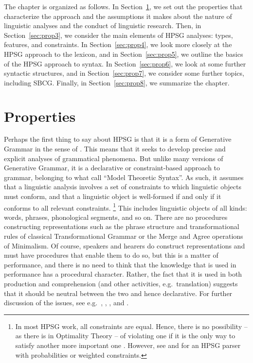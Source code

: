 \documentclass[output=paper
	        ,collection
	        ,collectionchapter
 	        ,biblatex
                ,babelshorthands
                ,newtxmath
                ,draftmode
                ,colorlinks, citecolor=brown
]{langscibook}
\begin{document}
The chapter is organized as follows. In Section~\ref{sec:prop2}, we set out the properties that characterize the approach and the assumptions it makes about the nature of linguistic analyses and the conduct of linguistic research. Then, in Section~\ref{sec:prop3}, we consider the main elements of HPSG analyses: types, features, and constraints. In Section~\ref{sec:prop4}, we look more closely at the HPSG approach to the lexicon, and in Section~\ref{sec:prop5}, we outline the basics of the HPSG approach to syntax. In Section~\ref{sec:prop6}, we look at some further syntactic structures, and in Section~\ref{sec:prop7}, we consider some further topics, including SBCG. Finally, in Section~\ref{sec:prop8}, we summarize the chapter.


\section{Properties}\label{sec:prop2}
\label{prop:sec-properties}

Perhaps the first thing to say about HPSG is that it is a form of Generative Grammar in the sense of \citet[]{Chomsky65a}. This means that it seeks to develop precise and explicit analyses of grammatical phenomena. But unlike many versions of Generative Grammar, it is a declarative or constraint-based approach to grammar, belonging to what \citet{PS2001a} call ``Model Theoretic Syntax''. As such, it assumes that a linguistic analysis involves a set of constraints to which linguistic objects must conform, and that a linguistic object is well-formed if and only if it conforms to all relevant constraints.%
%
\footnote{In most HPSG work, all constraints are equal. Hence, there is no possibility -- as there is in Optimality Theory -- of violating one if it is the only way to satisfy another more important one \citep{Malouf2003a}. However, see  and  for an HPSG parser with probabilities or weighted constraints.}
%
This includes linguistic objects of all kinds: words, phrases, phonological segments, and so on. There are no procedures constructing representations such as the phrase structure and transformational rules of classical Transformational Grammar or the Merge and Agree operations of Minimalism. Of course, speakers and hearers do construct representations and must have procedures that enable them to do so, but this is a matter of performance, and there is no need to think that the knowledge that is used in performance has a procedural character. Rather, the fact that it is used in both production and comprehension (and other activities, e.g.\ translation) suggests that it should be neutral between the two and hence declarative. For further discussion of the issues, see e.g.\ \citet{PS2001a}, \citet{Postal2003a}, \citet{SW2011a,SW2015a}, and .
\end{document}
